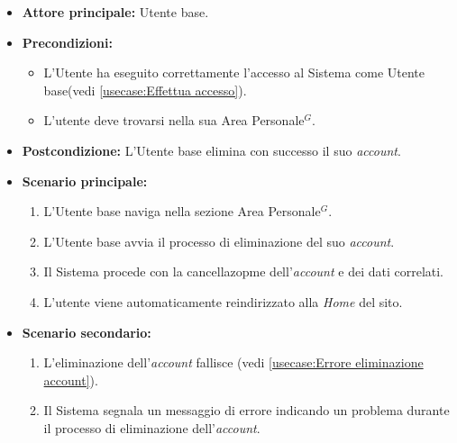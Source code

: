 \label{usecase:Eliminazione account}
\begin{itemize}
	\item \textbf{Attore principale:} Utente base.

	\item \textbf{Precondizioni:}
	\begin{itemize}
        \item L'Utente ha eseguito correttamente l'accesso al Sistema come Utente base(vedi \autoref{usecase:Effettua accesso}).
        \item L'utente deve trovarsi nella sua Area Personale$^G$.
    \end{itemize}

	\item \textbf{Postcondizione:} L'Utente base elimina con successo il suo \textit{account}.

	\item \textbf{Scenario principale:}
	      \begin{enumerate}
		      \item L'Utente base naviga nella sezione Area Personale$^G$.
		      \item L'Utente base avvia il processo di eliminazione del suo \textit{account}.
              \item Il Sistema procede con la cancellazopme dell'\textit{account} e dei dati correlati.
              \item L'utente viene automaticamente reindirizzato alla \textit{Home} del sito.
	      \end{enumerate}
	\item \textbf{Scenario secondario:}
			\begin{enumerate}
				\item L'eliminazione dell'\textit{account} fallisce (vedi \autoref{usecase:Errore eliminazione account}).
				\item Il Sistema segnala un messaggio di errore indicando un problema durante il processo di eliminazione dell'\textit{account}.
			\end{enumerate}
\end{itemize}